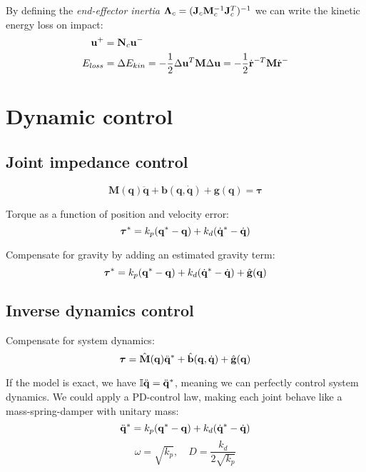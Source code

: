 \documentclass[a4paper, 8pt]{extarticle}
\begin{document}
\begin{multicols*}{3}
By defining the \emph{end-effector inertia} $\bm\Lambda_c = ({\bf J}_c{\bf M}_c^{-1}{\bf J}_c^T)^{-1}$ we can write the kinetic energy loss on impact:
\begin{align*}
{\bf u}^+ &= {\bf N}_c{\bf u}^-\\
E_{loss} &= \Delta E_{kin} = - \frac 12 \Delta{\bf u}^T{\bf M}\Delta{\bf u} = - \frac 12 \dot{\bf r}^{-T}{\bf M}\dot{\bf r}^{-}
\end{align*}







\section{Dynamic control}

\subsection*{Joint impedance control}
$$\boxed{\mathbf{ M(q)\ddot{q} + b(q,\dot q) + g(q)} = 
\bm\tau}$$

Torque as a function of position and velocity error:
$${\bm \tau}^* = k_p({\bf q}^* - {\bf q}) + k_d(\dot{\bf q}^* - \dot{\bf q})$$

Compensate for gravity by adding an estimated gravity term:
$${\bm \tau}^* = k_p({\bf q}^* - {\bf q}) + k_d(\dot{\bf q}^* - \dot{\bf q}) + \hat{\bf g}({\bf q})$$

\subsection*{Inverse dynamics control}

Compensate for system dynamics:
$$\bm\tau = \hat{\bf M}({\bf q})\ddot{\bf q}^* + \hat{\bf b}({\bf q}, \dot{\bf q}) + \hat{\bf g}({\bf q})$$

If the model is exact, we have $\mathbb{I}\ddot{\bf q} = \ddot{\bf q}^*$, meaning we can perfectly control system dynamics. We could apply a PD-control law, making each joint behave like a mass-spring-damper with unitary mass:
$$\ddot{\bf q}^* = k_p({\bf q}^* - {\bf q}) + k_d(\dot{\bf q}^* - \dot{\bf q})$$
$$\omega = \sqrt{k_p}, \quad D = \frac{k_d}{2\sqrt{k_p}}$$


\end{multicols*}
\end{document}
